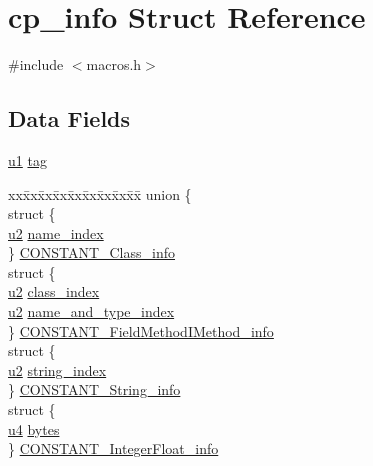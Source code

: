 \hypertarget{structcp__info}{}\section{cp\+\_\+info Struct Reference}
\label{structcp__info}


{\ttfamily \#include $<$macros.\+h$>$}

\subsection*{Data Fields}
\begin{DoxyCompactItemize}
\item 
\hyperlink{macros_8h_ad9f4cdb6757615aae2fad89dab3c5470}{u1} \hyperlink{structcp__info_a17726ed17c64ec8550633ebf17fd1a98}{tag}
\item 
\begin{tabbing}
xx\=xx\=xx\=xx\=xx\=xx\=xx\=xx\=xx\=\kill
union \{\\
\>struct \{\\
\>\>\hyperlink{macros_8h_a732cde1300aafb73b0ea6c2558a7a54f}{u2} \hyperlink{structcp__info_ae939ac3ca00f5727beaa02d0e339183d}{name\_index}\\
\>\} \hyperlink{structcp__info_a81815f296dbd9371a865d7bedaf3d95a}{CONSTANT\_Class\_info}\\
\>struct \{\\
\>\>\hyperlink{macros_8h_a732cde1300aafb73b0ea6c2558a7a54f}{u2} \hyperlink{structcp__info_a6004155348b07eae6cb68d413191efe9}{class\_index}\\
\>\>\hyperlink{macros_8h_a732cde1300aafb73b0ea6c2558a7a54f}{u2} \hyperlink{structcp__info_adec52fa6971122714e8d390dd4b38048}{name\_and\_type\_index}\\
\>\} \hyperlink{structcp__info_abc2ef35b12787198c93c9c88c474cf93}{CONSTANT\_FieldMethodIMethod\_info}\\
\>struct \{\\
\>\>\hyperlink{macros_8h_a732cde1300aafb73b0ea6c2558a7a54f}{u2} \hyperlink{structcp__info_a983a5b138b680d917526211445dbcdbf}{string\_index}\\
\>\} \hyperlink{structcp__info_ad9b88642aaf83cf2bf8fdfc8652f84a1}{CONSTANT\_String\_info}\\
\>struct \{\\
\>\>\hyperlink{macros_8h_ae5be1f726785414dd1b77d60df074c9d}{u4} \hyperlink{structcp__info_a97a61703bfa9c32f2cfa2709825b67ee}{bytes}\\
\>\} \hyperlink{structcp__info_a2609b074d56fd21309a196815127e542}{CONSTANT\_IntegerFloat\_info}\\

\end{tabbing}
\end{DoxyCompactItemize}
